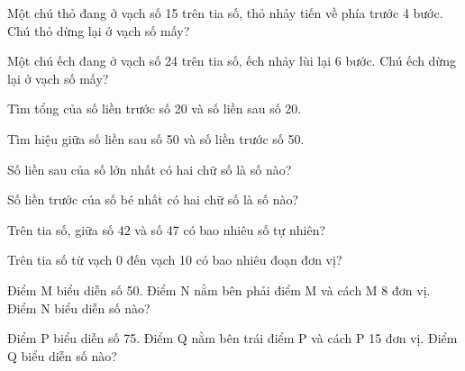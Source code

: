 \begin{ex}
Một chú thỏ đang ở vạch số 15 trên tia số, thỏ nhảy tiến về phía trước 4 bước. Chú thỏ dừng lại ở vạch số mấy?
\end{ex}

\begin{ex}
Một chú ếch đang ở vạch số 24 trên tia số, ếch nhảy lùi lại 6 bước. Chú ếch dừng lại ở vạch số mấy?
\end{ex}

\begin{ex}
Tìm tổng của số liền trước số 20 và số liền sau số 20.
\end{ex}

\begin{ex}
Tìm hiệu giữa số liền sau số 50 và số liền trước số 50.
\end{ex}

\begin{ex}
Số liền sau của số lớn nhất có hai chữ số là số nào?
\end{ex}

\begin{ex}
Số liền trước của số bé nhất có hai chữ số là số nào?
\end{ex}

\begin{ex}
Trên tia số, giữa số 42 và số 47 có bao nhiêu số tự nhiên?
\end{ex}

\begin{ex}
Trên tia số từ vạch 0 đến vạch 10 có bao nhiêu đoạn đơn vị?
\end{ex}

\begin{ex}
Điểm M biểu diễn số 50. Điểm N nằm bên phải điểm M và cách M 8 đơn vị. Điểm N biểu diễn số nào?
\end{ex}

\begin{ex}
Điểm P biểu diễn số 75. Điểm Q nằm bên trái điểm P và cách P 15 đơn vị. Điểm Q biểu diễn số nào?
\end{ex}

